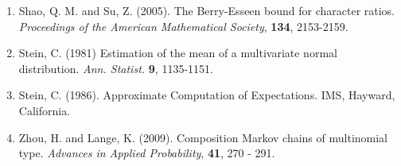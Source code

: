 \documentclass[10pt, amstex]{article}
\begin{document}
\begin{enumerate}
\item \label{ShSu} Shao, Q. M. and Su, Z. (2005). The Berry-Esseen bound for character ratios.
{\em Proceedings of the American Mathematical Society}, {\bf 134}, 2153-2159.

\item \label{Steinchar} Stein, C. (1981) Estimation of the mean of a multivariate normal distribution.  {\em Ann. Statist.} {\bf 9}, 1135-1151.

\item \label{Stein86} Stein, C. (1986). Approximate Computation of Expectations. IMS, Hayward, California.

\item \label{zl} Zhou, H. and Lange, K. (2009). Composition Markov chains of multinomial type. {\em Advances in Applied Probability}, {\bf 41}, 270 - 291.

 \end{enumerate}
\end{document}
